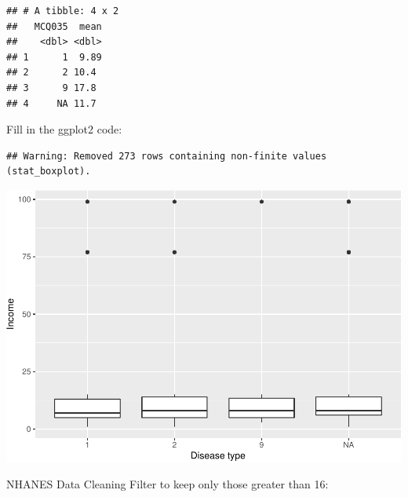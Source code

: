 \documentclass[]{book}
\newenvironment{Shaded}{\begin{snugshade}}{\end{snugshade}}
\newcommand{\DataTypeTok}[1]{\textcolor[rgb]{0.13,0.29,0.53}{#1}}
\newcommand{\DecValTok}[1]{\textcolor[rgb]{0.00,0.00,0.81}{#1}}
\newcommand{\KeywordTok}[1]{\textcolor[rgb]{0.13,0.29,0.53}{\textbf{#1}}}
\newcommand{\NormalTok}[1]{#1}
\newcommand{\OperatorTok}[1]{\textcolor[rgb]{0.81,0.36,0.00}{\textbf{#1}}}
\newcommand{\StringTok}[1]{\textcolor[rgb]{0.31,0.60,0.02}{#1}}
\begin{document}
\begin{verbatim}
## # A tibble: 4 x 2
##   MCQ035  mean
##    <dbl> <dbl>
## 1      1  9.89
## 2      2 10.4 
## 3      9 17.8 
## 4     NA 11.7
\end{verbatim}

Fill in the ggplot2 code:

\begin{Shaded}
\end{Shaded}

\begin{verbatim}
## Warning: Removed 273 rows containing non-finite values (stat_boxplot).
\end{verbatim}

\includegraphics{code4stem_files/figure-latex/plot data-1.pdf}

NHANES Data Cleaning
Filter to keep only those greater than 16:

\begin{Shaded}
\end{Shaded}
\end{document}
